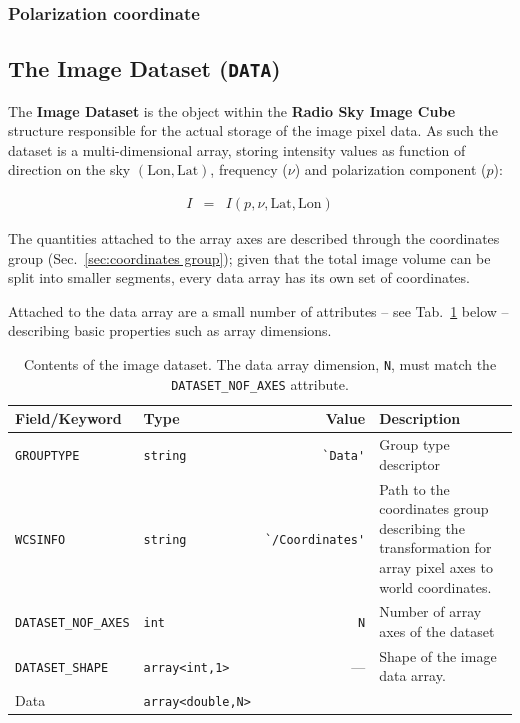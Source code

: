 \documentclass[a4paper,10pt,bibtotoc]{scrartcl}
\begin{document}


\subsubsection{Polarization coordinate}
\label{sec:coord-polarization}




\subsection{The Image Dataset ({\tt DATA})}
\label{sec:image dataset}

The \textbf{Image Dataset} is the object within the \textbf{Radio Sky Image Cube}
structure responsible for the actual storage of the image pixel
data. As such the dataset is a multi-dimensional array, storing
intensity values as function of direction on the sky
$(\mathrm{Lon},\mathrm{Lat})$, frequency ($\nu$) and polarization
component ($p$):

\begin{eqnarray}
  I & = & I (p,\nu,\mathrm{Lat},\mathrm{Lon})
\end{eqnarray}

The quantities attached to the array axes are described through the
coordinates group (Sec.~\ref{sec:coordinates group}); given that the
total image volume can be split into smaller segments, every data
array has its own set of coordinates.

Attached to the data array are a small number of attributes -- see
Tab.~\ref{tab:image dataset} below -- describing basic properties such
as array dimensions.

\begin{table}[htbp]
  \centering
  \begin{tabular}{|llrp{6cm}|}
    \hline
    \sc Field/Keyword & \sc Type & \sc Value & \sc Description \\
    \hline \hline
    \small\verb|GROUPTYPE| & \texttt{string} &\verb|`Data'|& Group type descriptor \\
    \small\verb|WCSINFO| & \texttt{string} &\verb|`/Coordinates'| &
    Path to the coordinates group describing the transformation for
    array pixel axes to world coordinates. \\
    \small{\verb|DATASET_NOF_AXES|} & \verb|int| & \verb|N| & Number of
    array axes of the dataset \\
    \small{\verb|DATASET_SHAPE|}    & \verb|array<int,1>| & --- &
    Shape of the image data array. \\
    \hline \hline
    \sc Data & \verb|array<double,N>| & & \\
    \hline
  \end{tabular}
  \caption{Contents of the image dataset. The data array dimension,
  \texttt{N}, must match the \texttt{DATASET\_NOF\_AXES} attribute. }
  \label{tab:image dataset}
\end{table}
\end{document}
